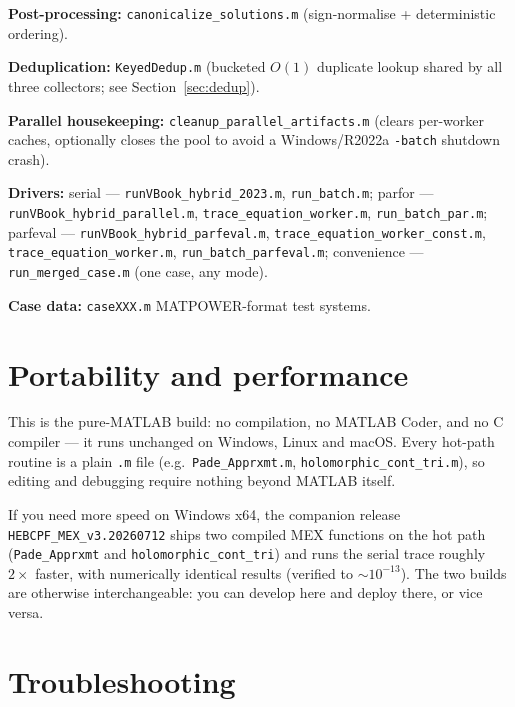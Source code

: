 \documentclass[11pt,a4paper]{article}
\newcommand{\code}[1]{\texttt{#1}}
\begin{document}
\textbf{Post-processing:} \code{canonicalize_solutions.m} (sign-normalise + deterministic
ordering).

\textbf{Deduplication:} \code{KeyedDedup.m} (bucketed $O(1)$ duplicate lookup shared by all
three collectors; see Section~\ref{sec:dedup}).

\textbf{Parallel housekeeping:} \code{cleanup_parallel_artifacts.m} (clears per-worker
caches, optionally closes the pool to avoid a Windows/R2022a \code{-batch} shutdown
crash).

\textbf{Drivers:}
serial --- \code{runVBook_hybrid_2023.m}, \code{run_batch.m};
parfor --- \code{runVBook_hybrid_parallel.m}, \code{trace_equation_worker.m},
\code{run_batch_par.m};
parfeval --- \code{runVBook_hybrid_parfeval.m}, \code{trace_equation_worker_const.m},
\code{trace_equation_worker.m}, \code{run_batch_parfeval.m};
convenience --- \code{run_merged_case.m} (one case, any mode).

\textbf{Case data:} \code{caseXXX.m} MATPOWER-format test systems.

\section{Portability and performance}

This is the pure-MATLAB build: no compilation, no MATLAB Coder, and no C compiler --- it
runs unchanged on Windows, Linux and macOS. Every hot-path routine is a plain \code{.m}
file (e.g.\ \code{Pade_Apprxmt.m}, \code{holomorphic_cont_tri.m}), so editing and
debugging require nothing beyond MATLAB itself.

If you need more speed on Windows x64, the companion release \code{HEBCPF_MEX_v3.20260712}
ships two compiled MEX functions on the hot path (\code{Pade_Apprxmt} and
\code{holomorphic_cont_tri}) and runs the serial trace roughly $2\times$ faster, with
numerically identical results (verified to $\sim 10^{-13}$). The two builds are otherwise
interchangeable: you can develop here and deploy there, or vice versa.

\section{Troubleshooting}
\end{document}

